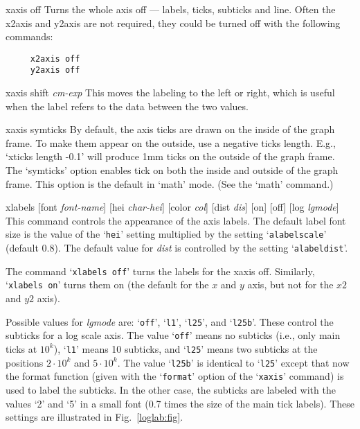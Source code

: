 \begin{commanddescription}
\item[{\sf xaxis off}  ]
Turns the whole axis off --- labels, ticks, subticks and line.
Often the x2axis and y2axis are not required, they could be
turned off with the following commands:

\preglecode{}
\begin{Verbatim}
     x2axis off
     y2axis off
\end{Verbatim}
\postglecode{}

\item[{\sf xaxis shift {\it cm-exp}}  ]
This moves the labeling to the left or right, which is useful when
the label refers to the data between the two values.

\item[{\sf xaxis symticks}]
By default, the axis ticks are drawn on the inside of the graph frame. To make them appear on the outside, use a negative ticks length. E.g., `{\sf xticks length -0.1}' will produce 1mm ticks on the outside of the graph frame. The `symticks' option enables tick on both the inside and outside of the graph frame. This option is the default in `math' mode. (See the `{\sf math}' command.)

\item[{\sf xlabels [font {\it font-name}] [hei {\it char-hei}] [color {\it col}] [dist {\it dis}] [on] [off] [log {\it lgmode}]}]
This command controls the appearance of the axis labels. The default label font size is the value of the `\texttt{hei}' setting multiplied by the setting `\texttt{alabelscale}' (default 0.8). The default value for {\it dist} is controlled by the setting `\texttt{alabeldist}'.

The command `\texttt{xlabels off}' turns the labels for the xaxis off. Similarly, `\texttt{xlabels on}' turns them on (the default for the $x$ and $y$ axis, but not for the $x2$ and $y2$ axis).

Possible values for {\it lgmode} are: `\texttt{off}', `\texttt{l1}', `\texttt{l25}', and `\texttt{l25b}'. These control the subticks for a log scale axis. The value `\texttt{off}' means no subticks (i.e., only main ticks at $10^k$), `\texttt{l1}' means 10 subticks, and `\texttt{l25}' means two subticks at the positions $2\cdot 10^k$ and $5\cdot 10^k$. The value `\texttt{l25b}' is identical to `\texttt{l25}' except that now the format function (given with the `\texttt{format}' option of the `\texttt{xaxis}' command) is used to label the subticks. In the other case, the subticks are labeled with the values `2' and `5' in a small font (0.7 times the size of the main tick labels). These settings are illustrated in Fig.~\ref{loglab:fig}.


\end{commanddescription}
